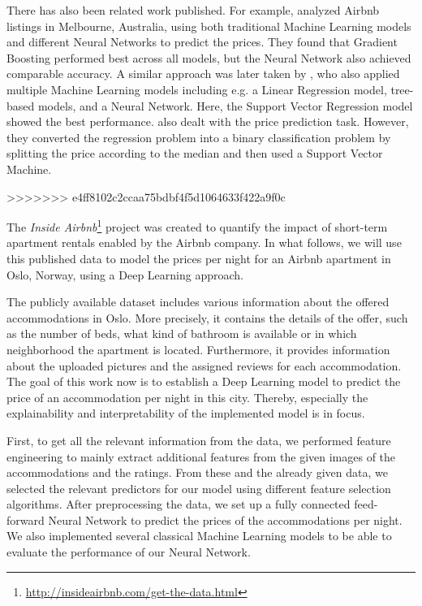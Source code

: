 There has also been related work published. For example, \citet{cai2019} analyzed Airbnb listings in Melbourne, Australia, using both traditional Machine Learning models and different Neural Networks to predict the prices. They found that Gradient Boosting performed best across all models, but the Neural Network also achieved comparable accuracy. 
A similar approach was later taken by \citet{rezazadeh2021}, who also applied multiple Machine Learning models including e.g. a Linear Regression model, tree-based models, and a Neural Network. Here, the Support Vector Regression model showed the best performance.
\citet{tang2015} also dealt with the price prediction task. However, they converted the regression problem into a binary classification problem by splitting the price according to the median and then used a Support Vector Machine.  



















>>>>>>> e4ff8102c2ccaa75bdbf4f5d1064633f422a9f0c

The \emph{Inside Airbnb}\footnote{\url{http://insideairbnb.com/get-the-data.html}} project \citep{cox2022} was created to quantify the impact of short-term apartment rentals enabled by the Airbnb company.
In what follows, we will use this published data to model the prices per night for an Airbnb apartment in Oslo, Norway, using a Deep Learning approach.

The publicly available dataset includes various information about the offered accommodations in Oslo.
More precisely, it contains the details of the offer, such as the number of beds, what kind of bathroom is available or in which neighborhood the apartment is located.
Furthermore, it provides information about the uploaded pictures and the assigned reviews for each accommodation.
The goal of this work now is to establish a Deep Learning model to predict the price of an accommodation per night in this city.
Thereby, especially the explainability and interpretability of the implemented model is in focus.

First, to get all the relevant information from the data, we performed feature engineering to mainly extract additional features from the given images of the accommodations and the ratings.
From these and the already given data, we selected the relevant predictors for our model using different feature selection algorithms.
After preprocessing the data, we set up a fully connected feed-forward Neural Network to predict the prices of the accommodations per night.
We also implemented several classical Machine Learning models to be able to evaluate the performance of our Neural Network.

